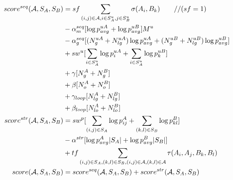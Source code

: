\documentclass{article}
\newcommand{\A}{{\cal A}}
\begin{document}

\begin{align*}
  score^{seq}(\A,S_A,S_B)
  &= sf \sum_{(i,j)\in\A,i\in S^u_A, j\in S^u_B} \sigma(A_i,B_k)  \qquad // (sf=1)\\
  &- \alpha^{seq}_m [\log p_{avg}^{uA} + \log p_{avg}^{uB} ] M^u \\
  &- \alpha_g^{seq} [ (N_g^{uA}+N_{lg}^{uA}) \log p_{avg}^{uA} + (N_g^{uB}+N_{lg}^{uB}) \log p_{avg}^{uB} ] \\
  &+ sw^u [ \sum_{i\in S^u_A} \log p^{uA}_i + \sum_{i\in S^u_A} \log p^{uB}_k ] \\
  &+ \gamma [ N^A_g + N^B_g ] \\
  &+ \beta [ N^A_o + N^B_o ] \\
  &+ \gamma_{loop} [ N^A_{lg} + N^B_{lg} ] \\
  &+ \beta_{loop} [ N^A_{lo} + N^B_{lo} ] \\
  score^{str}(\A,S_A,S_B)
  &= sw^p [ \sum_{(i,j)\in S_A} \log p^A_{ij} + \sum_{(k,l)\in S_B} \log p^B_{kl} ] \\ 
  &- \alpha^{str} [ \log p^A_{avg} |S_A|  + \log p^B_{avg} |S_B| ] \\
  &+ tf \sum_{(i,j)\in S_A,(k,l)\in S_B,(i,j)\in\A,(k,l)\in \A} \tau(A_i,A_j,B_k,B_l)\\
  score(\A,S_A,S_B) &= score^{seq}(\A,S_A,S_B) + score^{str}(\A,S_A,S_B)
\end{align*}
\end{document}
